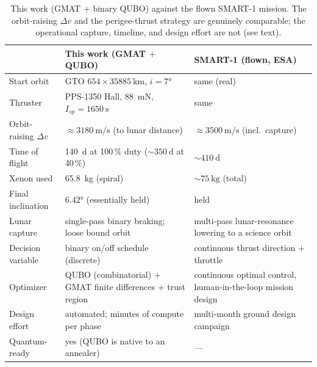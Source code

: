 \documentclass[11pt,a4paper]{article}
\theoremstyle{plain}
\newcommand{\dv}{\Delta v}
\begin{document}
\begin{table}[h]
\centering
\caption{This work (GMAT $+$ binary QUBO) against the flown SMART-1 mission.
The orbit-raising $\dv$ and the perigee-thrust strategy are genuinely
comparable; the operational capture, timeline, and design effort are not
(see text).}
\label{tab:head2head}
\small
\begin{tabular}{@{}p{2.7cm}p{5.9cm}p{5.9cm}@{}}
\toprule
 & \textbf{This work (GMAT $+$ QUBO)} & \textbf{SMART-1 (flown, ESA)} \\
\midrule
Start orbit & GTO $654\times\SI{35885}{\km}$, $i=\ang{7}$ & same (real) \\
Thruster & PPS-1350 Hall, \SI{88}{\milli\newton}, $I_{sp}=\SI{1650}{\second}$ & same \\
Orbit-raising $\dv$ & $\approx\SI{3180}{\meter\per\second}$ (to lunar distance) & $\approx\SI{3500}{\meter\per\second}$ (incl.\ capture) \\
Time of flight & \SI{140}{\day} at 100\,\% duty ($\sim\SI{350}{\day}$ at 40\,\%) & $\sim\SI{410}{\day}$ \\
Xenon used & \SI{65.8}{\kg} (spiral) & $\sim\SI{75}{\kg}$ (total) \\
Final inclination & $\ang{6.42}$ (essentially held) & held \\
Lunar capture & single-pass binary braking; loose bound orbit & multi-pass lunar-resonance lowering to a science orbit \\
\midrule
Decision variable & binary on/off schedule (discrete) & continuous thrust direction $+$ throttle \\
Optimizer & QUBO (combinatorial) $+$ GMAT finite differences $+$ trust region & continuous optimal control, human-in-the-loop mission design \\
Design effort & automated; minutes of compute per phase & multi-month ground design campaign \\
Quantum-ready & yes (QUBO is native to an annealer) & --- \\
\bottomrule
\end{tabular}
\end{table}
\end{document}
